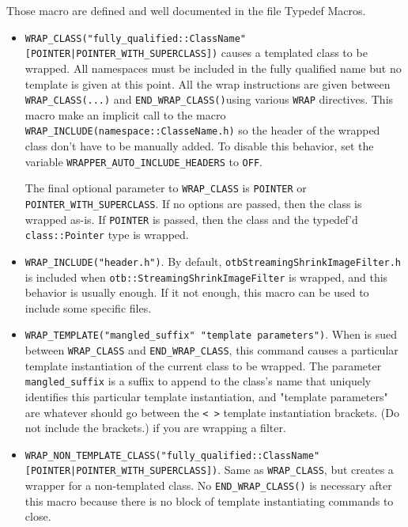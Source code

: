 Those macro are defined and well documented in the file Typedef Macros.

\begin{itemize}
  
\item \verb$WRAP_CLASS("fully_qualified::ClassName" [POINTER|POINTER_WITH_SUPERCLASS])$
  causes a templated class to be wrapped. All namespaces must be 
  included in the fully qualified name but no template is given 
  at this point. All the wrap instructions are given between 
  \verb$WRAP_CLASS(...)$ and \verb$END_WRAP_CLASS()$using various \verb$WRAP$ directives. 
  This macro make an implicit call to the macro \verb$WRAP_INCLUDE(namespace::ClasseName.h)$ so the 
  header of the wrapped class don't have to be manually added. To disable this behavior, 
  set the variable \verb$WRAPPER_AUTO_INCLUDE_HEADERS$ to \verb$OFF$.
  
  The final optional parameter to \verb$WRAP_CLASS$ is \verb$POINTER$ or
  \verb$POINTER_WITH_SUPERCLASS$. If no options are passed, then the class is wrapped
  as-is. If \verb$POINTER$ is passed, then the class and the typedef'd 
  \verb$class::Pointer$ type is wrapped.

\item \verb$WRAP_INCLUDE("header.h")$. By default, 
  \verb$otbStreamingShrinkImageFilter.h$ is included
  when \verb$otb::StreamingShrinkImageFilter$ is wrapped, and this behavior is usually
  enough. If it not enough, this macro can be used to include some specific files.
  
\item \verb$WRAP_TEMPLATE("mangled_suffix" "template parameters")$. When is sued between 
  \verb$WRAP_CLASS$ and \verb$END_WRAP_CLASS$, this command causes a particular template 
  instantiation of the current class to be wrapped. The parameter \verb$mangled_suffix$ is a suffix to
  append to the class's name that uniquely identifies this particular template
  instantiation, and "template parameters" are whatever should go between the \verb$< >$
  template instantiation brackets. (Do not include the brackets.) if you are
  wrapping a filter.

\item \verb$WRAP_NON_TEMPLATE_CLASS("fully_qualified::ClassName" [POINTER|POINTER_WITH_SUPERCLASS])$.
  Same as \verb$WRAP_CLASS$, but creates a wrapper
  for a non-templated class. No \verb$END_WRAP_CLASS()$ is necessary after this macro
  because there is no block of template instantiating commands to close.
  
\end{itemize}

